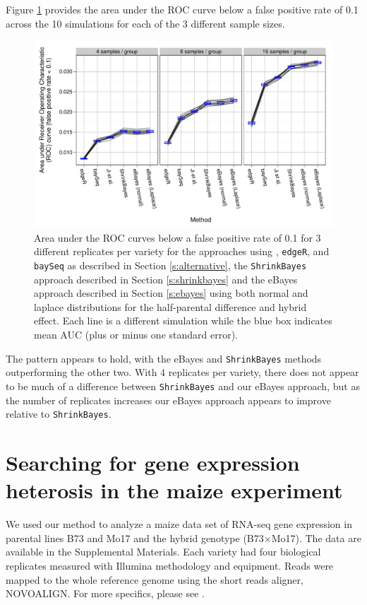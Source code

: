 \documentclass[useAMS,usenatbib,referee]{biom}
\newcommand{\edgeR}{{\tt edgeR}}
\newcommand{\baySeq}{{\tt baySeq}}
\newcommand{\ShrinkBayes}{{\tt ShrinkBayes}}
\newcommand{\RNAseq}{RNA-seq}
\begin{document}
Figure \ref{f:auc} provides the area under the ROC curve below a false positive rate of 0.1 across the 10 simulations for each of the 3 different sample sizes. 
\begin{figure}
\centerline{\includegraphics[width=\textwidth]{auc-facet-TRUE}}
\caption{Area under the ROC curves below a false positive rate of 0.1 for 3 different replicates per variety for the approaches using \citeauthor{ji2014estimation}, \edgeR{}, and \baySeq{} as described in Section \ref{s:alternative}, the \ShrinkBayes{} approach described in Section \ref{s:shrinkbayes} and the eBayes approach described in Section \ref{s:ebayes} using both normal and laplace distributions for the half-parental difference and hybrid effect. Each line is a different simulation while the blue box indicates mean AUC (plus or minus one standard error).}
\label{f:auc}
\end{figure}
The pattern appears to hold, with the eBayes and \ShrinkBayes{} methods outperforming the other two. With 4 replicates per variety, there does not appear to be much of a difference between \ShrinkBayes{} and our eBayes approach, but as the number of replicates increases our eBayes approach appears to improve relative to \ShrinkBayes{}.



\section{Searching for gene expression heterosis in the maize experiment}
\label{s:maize}

We used our method to analyze a maize data set \citep{paschold2012complementation} of \RNAseq{} gene expression in parental lines B73 and Mo17 and the hybrid genotype (B73$\times$Mo17). The data are available in the Supplemental Materials. Each variety had four biological replicates measured with Illumina methodology and equipment. Reads were mapped to the whole reference genome using the short reads aligner, NOVOALIGN. For more specifics, please see \cite{paschold2012complementation}. 
\end{document}

